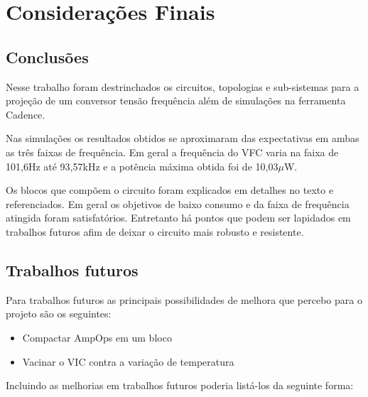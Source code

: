 \chapter[Considerações Finais]{Considerações Finais}

\section{Conclusões}

Nesse trabalho foram destrinchados os circuitos, topologias e sub-sistemas  para a projeção de um conversor tensão frequência além de simulações na ferramenta Cadence. 

Nas simulações os resultados obtidos se aproximaram das expectativas em ambas as três faixas de frequência. Em geral a frequência do VFC varia na faixa de 101,6Hz até 93,57kHz e a potência máxima obtida foi de 10,03$\mu$W.

Os blocos que compõem o circuito foram explicados em detalhes no texto e referenciados. Em geral os objetivos de baixo consumo e da faixa de frequência atingida foram satisfatórios. Entretanto há pontos que podem ser lapidados em trabalhos futuros afim de deixar o circuito mais robusto e resistente. 



\section{Trabalhos futuros}

Para trabalhos futuros as principais possibilidades de melhora que percebo para o projeto são os seguintes:
\begin{itemize}
\item Compactar AmpOps em um bloco
\item Vacinar o VIC contra a variação de temperatura
\end{itemize}

Incluindo as melhorias em trabalhos futuros poderia listá-los da seguinte forma:

